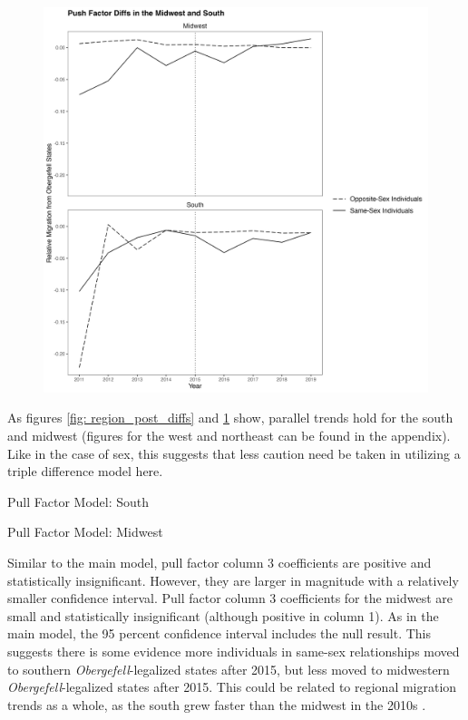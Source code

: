\documentclass[12pt,letterpaper]{article}
\begin{document}
\begin{figure}[htbp]
    \centering
    \includegraphics[width=1\linewidth]{outputs/summary_stats/region_ante_diffs.png}
    \caption{}
    \label{fig: region_ante_diffs}
\end{figure}

\floatBarrier
As figures \ref{fig: region_post_diffs} and \ref{fig: region_ante_diffs} show, parallel trends hold for the south and midwest (figures for the west and northeast can be found in the appendix). Like in the case of sex, this suggests that less caution need be taken in utilizing a triple difference model here. 
\begin{table}[htbp]
    \centering
    \caption{Pull Factor Model: South}
    \label{tab: south_expost_model}
    
\end{table}
\begin{table}[htbp]
    \centering
    \caption{Pull Factor Model: Midwest}
    \label{tab: midwest_expost_model}
    
\end{table}
Similar to the main model, pull factor column 3 coefficients are positive and statistically insignificant. However, they are larger in magnitude with a relatively smaller confidence interval. Pull factor column 3 coefficients for the midwest are small and statistically insignificant (although positive in column 1).  As in the main model, the 95 percent confidence interval includes the null result. This suggests there is some evidence more individuals in same-sex relationships moved to southern \textit{Obergefell}-legalized states after 2015, but less moved to midwestern \textit{Obergefell}-legalized states after 2015. This could be related to regional migration trends as a whole, as the south grew faster than the midwest in the 2010s \citep{31}.
\end{document}
